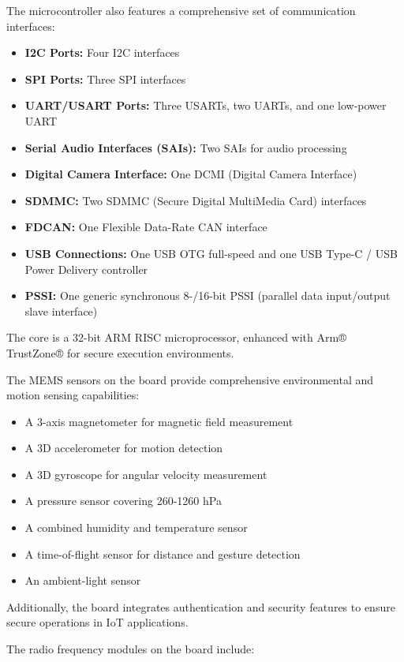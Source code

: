\documentclass[10pt,a4paper,onecolumn]{article}
\begin{document}
The microcontroller also features a comprehensive set of communication interfaces:

\begin{itemize}
  \item \textbf{I2C Ports:} Four I2C interfaces
  \item \textbf{SPI Ports:} Three SPI interfaces
  \item \textbf{UART/USART Ports:} Three USARTs, two UARTs, and one low-power UART
  \item \textbf{Serial Audio Interfaces (SAIs):} Two SAIs for audio processing
  \item \textbf{Digital Camera Interface:} One DCMI (Digital Camera Interface)
  \item \textbf{SDMMC:} Two SDMMC (Secure Digital MultiMedia Card) interfaces
  \item \textbf{FDCAN:} One Flexible Data-Rate CAN interface
  \item \textbf{USB Connections:} One USB OTG full-speed and one USB Type-C / USB Power Delivery controller
  \item \textbf{PSSI:} One generic synchronous 8-/16-bit PSSI (parallel data input/output slave interface)
\end{itemize}

The core is a 32-bit ARM RISC microprocessor, enhanced with Arm® TrustZone® for secure execution environments.

The MEMS sensors on the board provide comprehensive environmental and motion sensing capabilities:

\begin{itemize}
  \item A 3-axis magnetometer for magnetic field measurement
  \item A 3D accelerometer for motion detection
  \item A 3D gyroscope for angular velocity measurement
  \item A pressure sensor covering 260-1260 hPa
  \item A combined humidity and temperature sensor
  \item A time-of-flight sensor for distance and gesture detection
  \item An ambient-light sensor
\end{itemize}

Additionally, the board integrates authentication and security features to ensure secure operations in IoT applications.

The radio frequency modules on the board include:
\end{document}
